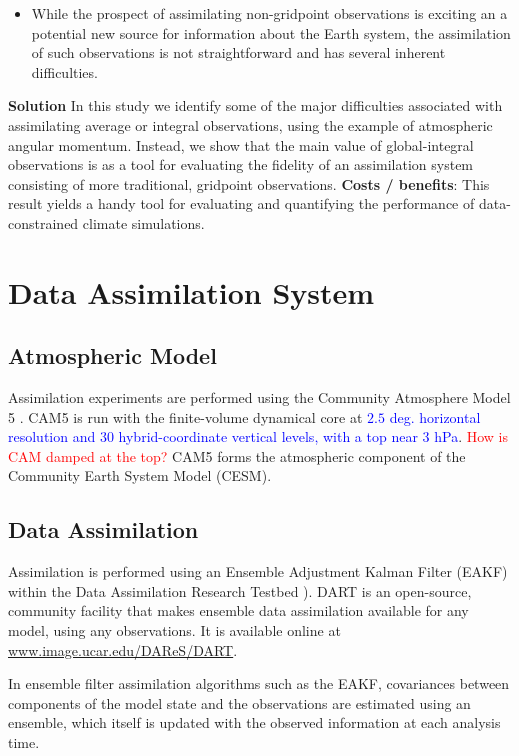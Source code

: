 \documentclass[draft,jgrga]{agutex}
\begin{document}
\begin{article}
\begin{itemize}
\item While the prospect of assimilating non-gridpoint observations is exciting an a potential new source for information about the Earth system, the assimilation of such observations is not straightforward and has several inherent difficulties.
\end{itemize}
%
%
 \textbf{Solution}
In this study we identify some of the major difficulties associated with assimilating average or integral observations, using the example of atmospheric angular momentum.  Instead, we show that the main value of global-integral observations is as a tool for evaluating the fidelity of an assimilation system consisting of more traditional, gridpoint observations.
%
%
 \textbf{Costs / benefits}: 
This result yields a handy tool for evaluating and quantifying the performance of data-constrained climate simulations. 
%
%


\section{Data Assimilation System}

\subsection{Atmospheric Model}
Assimilation experiments are performed using the Community Atmosphere Model 5 \citep[CAM5 hereafter]{nealeetal2011}.
CAM5 is run with the finite-volume dynamical core at \textcolor{blue}{$2.5$ deg. horizontal resolution and 30 hybrid-coordinate vertical levels, with a top near 3 hPa}.
\textcolor{red}{How is CAM damped at the top?}
CAM5 forms the atmospheric component of the Community Earth System Model (CESM).

\subsection{Data Assimilation}
Assimilation is performed using an Ensemble Adjustment Kalman Filter (EAKF) within the Data Assimilation Research Testbed \citep[DART hereafter]{andersonetal2009, raederetal2012}).
DART is an open-source, community facility that makes ensemble data assimilation available for any model, using any observations.
It is available online at \url{www.image.ucar.edu/DAReS/DART}.

In ensemble filter assimilation algorithms such as the EAKF, covariances between components of the model state and the observations are estimated using an ensemble, which itself is updated with the observed information at each analysis time.


\end{article}
\end{document}
